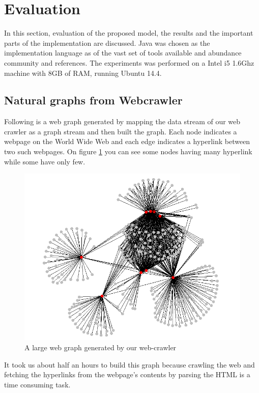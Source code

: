 \documentclass[conference]{IEEEtran}
\begin{document}
\newpage

\section{Evaluation}
In this section, evaluation of the proposed model, the results and the important parts of the implementation are discussed. Java was chosen as the implementation language as of the vast set of tools available and abundance community and references. The experiments was performed on a Intel i5 1.6Ghz machine with 8GB of RAM, running Ubuntu 14.4.

\subsection{Natural graphs from Webcrawler}
Following is a web graph generated by mapping the data stream of our web crawler as a graph stream and then built the graph. Each node indicates a webpage on the World Wide Web and each edge indicates a hyperlink between two such webpages. On figure \ref{fig:A large web graph generated by our web-crawler} you can see some nodes having many hyperlink while some have only few. 

\begin{figure}[!t]
\centering
\includegraphics[width=\linewidth]{web-graph}
\caption{A large web graph generated by our web-crawler}
\label{fig:A large web graph generated by our web-crawler}
\end{figure}

It took us about half an hours to build this graph because crawling the web and fetching the hyperlinks from the webpage’s contents by parsing the HTML is a time consuming task. 
\end{document}
